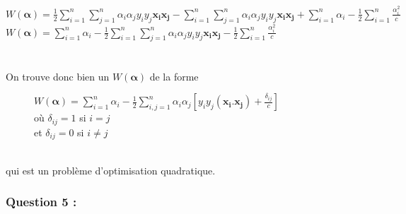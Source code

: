 \documentclass[a4paper, 10pt]{article}
\begin{document}
$W(\boldsymbol{\alpha}) = 
\frac{1}{2} \sum^{n}_{i=1}\sum^{n}_{j=1}\alpha_{i}\alpha_{j}y_{i}y_{j}\mathbf{x_{i}}\mathbf{x_{j}} 
- \sum^{n}_{i=1}\sum^{n}_{j=1}\alpha_{i}\alpha_{j}y_{i}y_{j}\mathbf{x_{i}}\mathbf{x_{j}} 
+\sum^{n}_{i=1}\alpha_{i} 
-\frac{1}{2}\sum^{n}_{i=1}\frac{\alpha_{i}^{2}}{c}$\\

$W(\boldsymbol{\alpha}) = 
\sum^{n}_{i=1}\alpha_{i} 
- \frac{1}{2} \sum^{n}_{i=1}\sum^{n}_{j=1}\alpha_{i}\alpha_{j}y_{i}y_{j}\mathbf{x_{i}}\mathbf{x_{j}}
-\frac{1}{2}\sum^{n}_{i=1}\frac{\alpha_{i}^{2}}{c}$\\ \\ \\
On trouve donc bien un $W(\boldsymbol{\alpha})$ de la forme 
\begin{figure}[h!]
 \centering
$W(\boldsymbol{\alpha}) = \sum^{n}_{i=1}\alpha_{i} - \frac{1}{2}\sum^{n}_{i,j=1}\alpha_{i}\alpha_{j}[y_{i}y_{j}(\mathbf{x_{i}}.\mathbf{x_{j}})+ \frac{\delta_{ij}}{c}]$\\
où $\delta_{ij} = 1$ si $i=j$\\
et $\delta_{ij} = 0$ si $i\neq j$
\end{figure}\\
qui est un problème d'optimisation quadratique.

\newpage
\subsubsection*{Question 5 :}
\end{document}

